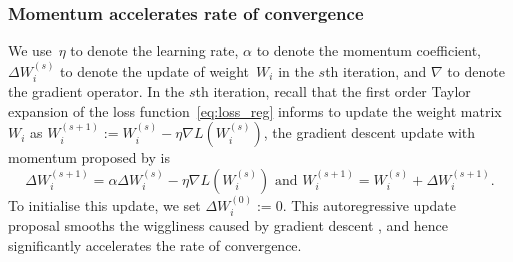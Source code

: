 \subsubsection{Momentum accelerates rate of convergence}
We use~$\eta$ to denote the learning rate, $\alpha$ to denote the momentum coefficient, $\Delta W_i^{(s)}$ to denote the update of weight~$W_i$ in the $s$th iteration, and $\nabla$ to denote the gradient operator. In the $s$th iteration, recall that the first order Taylor expansion of the loss function~\eqref{eq:loss_reg} informs to update the weight matrix~$W_i$ as $W_i^{(s+1)}:=W_i^{(s)}-\eta\nabla L(W_i^{(s)})$, the gradient descent update with momentum proposed by \citet{rumelhart1986learning} is
\begin{equation*}
    \Delta W_i^{(s+1)}=\alpha \Delta W_i^{(s)}-\eta \nabla L(W_i^{(s)})\text{ and } W_i^{(s+1)}=W_i^{(s)}+\Delta W_i^{(s+1)}.
\end{equation*}
To initialise this update, we set $\Delta W_i^{(0)}:=0$. This autoregressive update proposal smooths the wiggliness caused by gradient descent \citep{rumelhart1986learning}, and hence significantly accelerates the rate of convergence.

